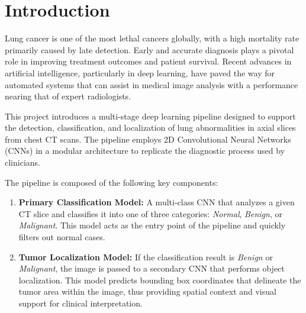 
\section{Introduction}

Lung cancer is one of the most lethal cancers globally, with a high mortality rate primarily caused 
by late detection. Early and accurate diagnosis plays a pivotal role in improving treatment outcomes 
and patient survival. Recent advances in artificial intelligence, particularly in deep learning, 
have paved the way for automated systems that can assist in medical image analysis with a 
performance nearing that of expert radiologists.

This project introduces a multi-stage deep learning pipeline designed to support the detection, 
classification, and localization of lung abnormalities in axial slices from chest CT scans. The 
pipeline employs 2D Convolutional Neural Networks (CNNs) in a modular architecture to replicate the 
diagnostic process used by clinicians.

The pipeline is composed of the following key components:

\begin{enumerate}
    \item \textbf{Primary Classification Model:} A multi-class CNN that analyzes a given CT slice 
    and classifies it into one of three categories: \emph{Normal}, \emph{Benign}, or 
    \emph{Malignant}. This model acts as the entry point of the pipeline and quickly filters out 
    normal cases.

    \item \textbf{Tumor Localization Model:} If the classification result is \emph{Benign} or 
    \emph{Malignant}, the image is passed to a secondary CNN that performs object localization. This 
    model predicts bounding box coordinates that delineate the tumor area within the image, thus 
    providing spatial context and visual support for clinical interpretation.

\end{enumerate}


